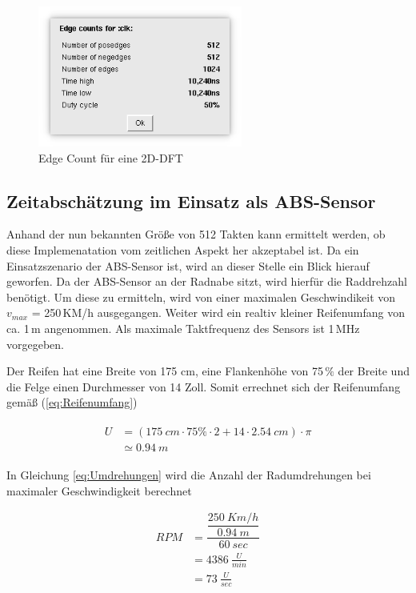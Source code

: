  \begin{figure}[htbp]
  \centering
  \includegraphics[width=0.6\textwidth]{img/Simulation_edge_count_clk.png}
  \caption{Edge Count für eine 2D-DFT}
 \end{figure}

 \subsection{Zeitabschätzung im Einsatz als ABS-Sensor}
 Anhand der nun bekannten Größe von 512 Takten kann ermittelt werden, ob diese Implemenatation vom zeitlichen Aspekt her akzeptabel ist.
 Da ein Einsatzszenario der ABS-Sensor ist, wird an dieser Stelle ein Blick hierauf geworfen. Da der ABS-Sensor an der Radnabe sitzt, wird 
 hierfür die Raddrehzahl benötigt. Um diese zu ermitteln, wird von einer maximalen Geschwindikeit von $v_{max}$ = 250\,KM/h ausgegangen. 
 Weiter wird ein realtiv kleiner Reifenumfang von ca. 1\,m angenommen. Als maximale Taktfrequenz des Sensors ist 1\,MHz vorgegeben.
 
 Der Reifen hat eine Breite von 175 cm, eine Flankenhöhe von 75\,$\%$ der Breite und die Felge einen Durchmesser von 14 Zoll. Somit errechnet sich der Reifenumfang
 gemäß (\ref{eq:Reifenumfang})
 
 \begin{align}\label{eq:Reifenumfang}
 \begin{split}
  U &= (\SI{175}{cm} \cdot 75\% \cdot 2 + 14 \cdot \SI{2.54}{cm})\cdot \pi\\
    &\simeq \SI{0,94}{m}
 \end{split}
 \end{align}

 In Gleichung \ref{eq:Umdrehungen} wird die Anzahl der Radumdrehungen bei maximaler Geschwindigkeit berechnet
 
 \begin{equation}\label{eq:Umdrehungen}
  \begin{split}
   RPM &= \dfrac{\dfrac{\SI{250}{Km/h}}{\SI{0,94}{m}}}{\SI{60}{sec}}\\
       &= \SI{4386}{\frac{U}{min}}\\
       &= \SI{73}{\frac{U}{sec}}
  \end{split}
 \end{equation}

